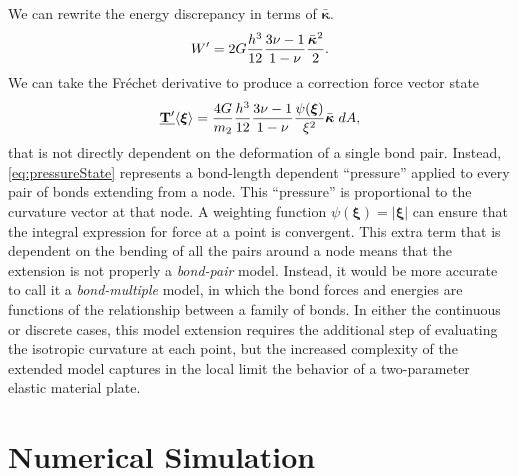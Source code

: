 \documentclass[preprint,review,12pt]{elsarticle}
\newcommand\vstate[3]{%
	\mathbf{\underline{#1}}%
	\ifstrempty{#2}{}{[#2]}%
	\ifstrempty{#3}{}{\langle #3 \rangle}}
\begin{document}
We can rewrite the energy discrepancy in terms of \(\bar{\boldsymbol{\kappa}}\).
%
\begin{equation}
    W'=2G\frac{h^3}{12}\frac{3\nu-1}{1-\nu}\frac{\bar{\boldsymbol{\kappa}}^2}{2}. \notag
\end{equation}
%
We can take the Fr\'{e}chet derivative to produce a correction force vector state
%
\begin{equation}
    \vstate{T'}{}{\boldsymbol{\xi}}=\frac{4G}{m_2}\frac{h^3}{12}\frac{3\nu-1}{1-\nu}\frac{\psi(\boldsymbol{\xi})}{\xi^2} \bar{\boldsymbol{\kappa}}\;dA,
    \label{eq:pressureState}
\end{equation}
%
that is not directly dependent on the deformation of a single bond pair.
Instead, \cref{eq:pressureState} represents a bond-length dependent ``pressure'' applied to every pair of bonds extending from a node.
This ``pressure'' is proportional to the curvature vector at that node.
A weighting function \(\psi(\boldsymbol{\xi}) = |\boldsymbol{\xi}|\) can ensure that the integral expression for force at a point is convergent.
This extra term that is dependent on the bending of all the pairs around a node means that the extension is not properly a \textit{bond-pair} model.
Instead, it would be more accurate to call it a \textit{bond-multiple} model, in which the bond forces and energies are functions of the relationship between a family of bonds.
In either the continuous or discrete cases, this model extension requires the additional step of evaluating the isotropic curvature at each point, but the increased complexity of the extended model captures in the local limit the behavior of a two-parameter elastic material plate.
%
\section{Numerical Simulation}
\end{document}
